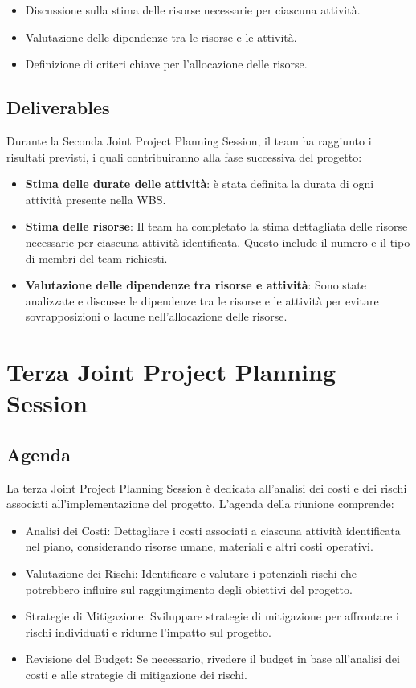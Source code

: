 \begin{itemize}
    \item Discussione sulla stima delle risorse necessarie per ciascuna attività.
    \item Valutazione delle dipendenze tra le risorse e le attività.
    \item Definizione di criteri chiave per l'allocazione delle risorse.
\end{itemize}

\subsection{Deliverables}

Durante la Seconda Joint Project Planning Session, il team ha raggiunto i risultati previsti, i quali contribuiranno alla fase successiva del progetto:

\begin{itemize}
    \item \textbf{Stima delle durate delle attività}: è stata definita la durata di ogni attività presente nella WBS.
    \item \textbf{Stima delle risorse}: Il team ha completato la stima dettagliata delle risorse necessarie per ciascuna attività identificata. Questo include il numero e il tipo di membri del team richiesti.
    \item \textbf{Valutazione delle dipendenze tra risorse e attività}: Sono state analizzate e discusse le dipendenze tra le risorse e le attività per evitare sovrapposizioni o lacune nell'allocazione delle risorse.
\end{itemize}

\section{Terza Joint Project Planning Session}

\subsection{Agenda}

La terza Joint Project Planning Session è dedicata all'analisi dei costi e dei rischi associati all'implementazione del progetto. L'agenda della riunione comprende:

\begin{itemize}
    \item Analisi dei Costi: Dettagliare i costi associati a ciascuna attività identificata nel piano, considerando risorse umane, materiali e altri costi operativi.
    \item Valutazione dei Rischi: Identificare e valutare i potenziali rischi che potrebbero influire sul raggiungimento degli obiettivi del progetto.
    \item Strategie di Mitigazione: Sviluppare strategie di mitigazione per affrontare i rischi individuati e ridurne l'impatto sul progetto.
    \item Revisione del Budget: Se necessario, rivedere il budget in base all'analisi dei costi e alle strategie di mitigazione dei rischi.
\end{itemize}

